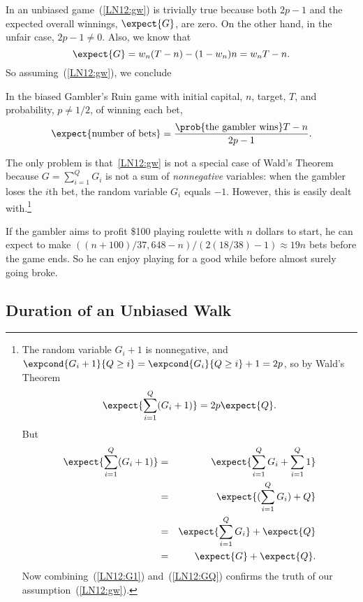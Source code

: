 In an unbiased game~(\ref{LN12:gw}) is trivially true because both $2p-1$ and
the expected overall winnings, $\expect{G}$, are zero.
On the other hand, in the unfair case, $2p-1 \neq 0$.  Also, we know that
\[
\expect{G} = w_n(T-n) - (1-w_n)n = w_nT-n.
\]
So assuming~(\ref{LN12:gw}), we conclude
\begin{theorem}\label{LN12:ExQthm}
In the biased Gambler's Ruin game with initial capital, $n$, target,
$T$, and probability, $p \neq 1/2$, of winning each bet,
\begin{equation}\label{LN12:ExQ}
\expect{\text{number of bets}} =
\frac{\prob{\text{the gambler wins}}T-n}{2p-1}.
\end{equation}
\end{theorem}

The only problem is that~\eqref{LN12:gw} is not a special case of Wald's
Theorem because $G = \sum_{i=1}^Q G_i$ is not a sum of \emph{nonnegative}
variables: when the gambler loses the $i$th bet, the random variable $G_i$
equals $-1$.  However, this is easily dealt with.\footnote{The random variable
$G_i+1$ is nonnegative, and $\expcond{G_i+1}{Q \geq i} =
\expcond{G_i}{Q\geq i}+1 = 2p$, so by Wald's Theorem
\begin{equation}\label{LN12:G1}
\expect{\sum_{i=1}^Q (G_i+1)}  = 2p\expect{Q}.
\end{equation}
But
\begin{eqnarray}
\expect{\sum_{i=1}^Q (G_i+1)} & = & \expect{\sum_{i=1}^Q G_i + \sum_{i=1}^Q 1}\notag\\
   & = & \expect{(\sum_{i=1}^Q G_i) + Q}\notag\\
   & = & \expect{\sum_{i=1}^Q G_i} + \expect{Q}\notag\\
   & = & \expect{G} + \expect{Q}\label{LN12:GQ}.
\end{eqnarray}
Now combining~(\ref{LN12:G1}) and~(\ref{LN12:GQ}) confirms the truth of our
assumption~(\ref{LN12:gw}).}

\begin{example}
If the gambler aims to profit \$100 playing roulette with $n$ dollars to
start, he can expect to make $((n+100)/37,648 - n)/(2(18/38) - 1) \approx
19n$ bets before the game ends.  So he can enjoy playing for a good while
before almost surely going broke.
\end{example}

\subsection{Duration of an Unbiased Walk}


